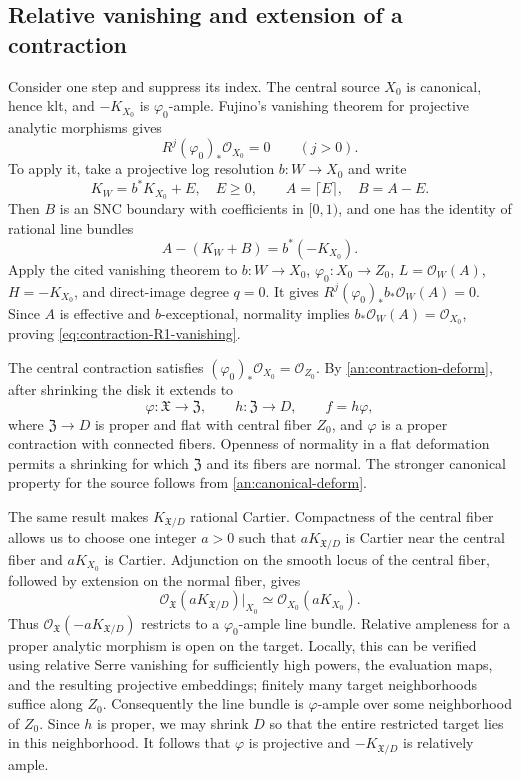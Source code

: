 \documentclass[11pt,a4paper]{article}
\theoremstyle{definition}\newtheorem{definition}[theorem]{Definition}
\theoremstyle{remark}\newtheorem*{remark}{Remark}
\newcommand{\OO}{\mathcal O}
\begin{document}
\subsection{Relative vanishing and extension of a contraction}

Consider one step and suppress its index. The central source $X_0$
is canonical, hence klt, and $-K_{X_0}$ is $\varphi_0$-ample.
Fujino's vanishing theorem for projective analytic morphisms
\cite[Theorem~1.1(ii)]{FujinoVanishing2025} gives
\begin{equation}\label{eq:contraction-R1-vanishing}
 R^j(\varphi_0)_*\OO_{X_0}=0\qquad(j>0).
\end{equation}
To apply it, take a projective log resolution $b:W\to X_0$ and write
\[
 K_W=b^*K_{X_0}+E,\quad E\ge0,\qquad
 A=\lceil E\rceil,\quad B=A-E.
\]
Then $B$ is an SNC boundary with coefficients in $[0,1)$, and one
has the identity of rational line bundles
\[
 A-(K_W+B)=b^*(-K_{X_0}).
\]
Apply the cited vanishing theorem to
$b:W\to X_0$, $\varphi_0:X_0\to Z_0$,
$L=\OO_W(A)$, $H=-K_{X_0}$, and direct-image degree $q=0$.
It gives $R^j(\varphi_0)_*b_*\OO_W(A)=0$.
Since $A$ is effective and $b$-exceptional, normality implies
$b_*\OO_W(A)=\OO_{X_0}$, proving
\eqref{eq:contraction-R1-vanishing}.

The central contraction satisfies
$(\varphi_0)_*\OO_{X_0}=\OO_{Z_0}$. By
\ref{an:contraction-deform}, after shrinking the disk it extends to
\[
 \varphi:\mathfrak X\longrightarrow\mathfrak Z,
 \qquad h:\mathfrak Z\longrightarrow D,
 \qquad f=h\varphi,
\]
where $\mathfrak Z\to D$ is proper and flat with central fiber
$Z_0$, and $\varphi$ is a proper contraction with connected
fibers. Openness of normality in a flat deformation permits a
shrinking for which $\mathfrak Z$ and its fibers are normal.
The stronger canonical property for the source follows from
\ref{an:canonical-deform}.

The same result makes $K_{\mathfrak X/D}$ rational Cartier.
Compactness of the central fiber allows us to choose one integer
$a>0$ such that $aK_{\mathfrak X/D}$ is Cartier near the central
fiber and $aK_{X_0}$ is Cartier. Adjunction on the smooth locus of
the central fiber, followed by extension on the normal fiber, gives
\[
 \OO_{\mathfrak X}(aK_{\mathfrak X/D})|_{X_0}
 \simeq\OO_{X_0}(aK_{X_0}).
\]
Thus $\OO_{\mathfrak X}(-aK_{\mathfrak X/D})$ restricts to a
$\varphi_0$-ample line bundle. Relative ampleness for a proper
analytic morphism is open on the target. Locally, this can be
verified using relative Serre vanishing for sufficiently high powers,
the evaluation maps, and the resulting projective embeddings; finitely
many target neighborhoods suffice along $Z_0$. Consequently the line
bundle is $\varphi$-ample over some neighborhood of $Z_0$.
Since $h$ is proper, we may shrink $D$ so that the entire restricted
target lies in this neighborhood. It follows that $\varphi$ is
projective and $-K_{\mathfrak X/D}$ is relatively ample.
\end{document}
